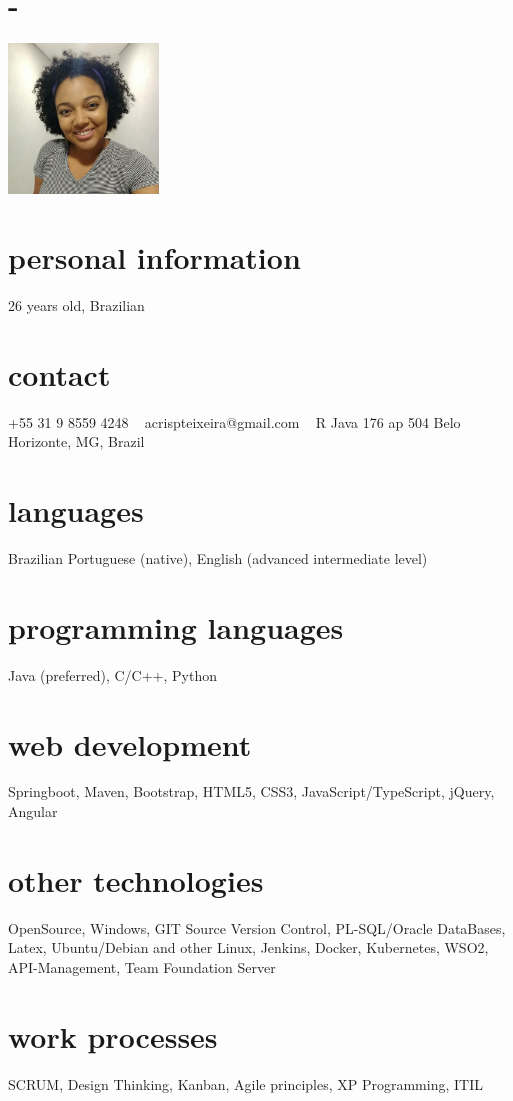 \documentclass[portuguese]{cv-style}     %
\begin{document}
\lastupdated

\begin{aside}
\section{-}
\includegraphics[width=4cm]{op02}
%
\section{personal information}
26 years old, Brazilian
%
\section{contact}
+55 31 9 8559 4248
~
acrispteixeira@gmail.com
~
R Java 176 ap 504
Belo Horizonte, MG, Brazil
%
\section{languages}
Brazilian Portuguese (native),
English (advanced intermediate level)
%
\section{programming languages}
Java (preferred), C/C++, Python
%
\section{web development}
Springboot, Maven, Bootstrap, HTML5, CSS3, JavaScript/TypeScript, jQuery, Angular
%
\section{other technologies}
OpenSource, Windows, GIT Source Version Control, PL-SQL/Oracle DataBases, Latex, Ubuntu/Debian and other Linux, Jenkins, Docker, Kubernetes, WSO2, API-Management, Team Foundation Server
%
\section{work processes}
SCRUM, Design Thinking, Kanban, Agile principles, XP Programming, ITIL
%
\end{aside}
\vspace{0.2cm}
\end{document}
